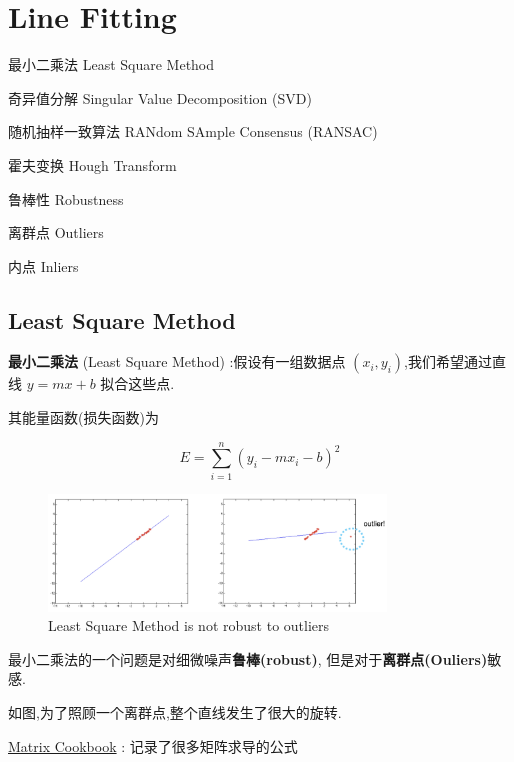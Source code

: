 \chapter{Line Fitting}

\begin{introduction}[Keywords]
    \item 最小二乘法 Least Square Method
    \item 奇异值分解 Singular Value Decomposition (SVD)
    \item 随机抽样一致算法 RANdom SAmple Consensus (RANSAC)
    \item 霍夫变换 Hough Transform
    \item 鲁棒性 Robustness
    \item 离群点 Outliers
    \item 内点 Inliers
\end{introduction}

\section{Least Square Method}

\textbf{最小二乘法} (Least Square Method) :假设有一组数据点 $(x_i, y_i)$,我们希望通过直线 $y = mx + b$ 拟合这些点.

其能量函数(损失函数)为

\begin{equation}
    E=\sum_{i=1}^n(y_i-mx_i-b)^2
\end{equation}

\begin{figure}[htbp]
    \centering
    \includegraphics[width=0.8\textwidth]{figures/not_roboust_outliner.png}
    \caption{Least Square Method is not robust to outliers}
\end{figure}

最小二乘法的一个问题是对细微噪声\textbf{鲁棒(robust)}, 但是对于\textbf{离群点(Ouliers)}敏感.

如图,为了照顾一个离群点,整个直线发生了很大的旋转.

\href{http://faculty.bicmr.pku.edu.cn/~wenzw/bigdata/matrix-cook-book.pdf}{Matrix Cookbook} : 记录了很多矩阵求导的公式

